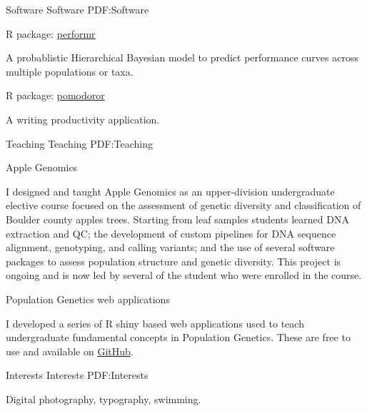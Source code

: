 \documentclass[letterpaper,MMMyyyy,nonstopmode]{simpleresumecv}
\begin{document}
\begin{Body}
{\Section
{Software}
{Software}
{PDF:Software}

\Gap
\BulletItem
R package: \href{https://github.com/silastittes/shiny_popgen}{\underline{performr}}
\hfill
\begin{Detail}
\Item A probablistic Hierarchical Bayesian model to predict performance curves across multiple populations or taxa. 
\end{Detail}

\BulletItem
R package: \href{https://github.com/silastittes/pomodoror}{\underline{pomodoror}}
\hfill
\begin{Detail}
\Item A writing productivity application.  
\end{Detail}



\Section
{Teaching}
{Teaching}
{PDF:Teaching}

\Gap
\BulletItem
Apple Genomics
\hfill
{}
\begin{Detail}
\Item I designed and taught Apple Genomics as an upper-division undergraduate elective course focused on the assessment of genetic diversity and classification of Boulder county apples trees. Starting from leaf samples students learned DNA extraction and QC; the development of custom pipelines for DNA sequence alignment, genotyping, and calling variants; and the use of several software packages to assess population structure and genetic diversity. This project is ongoing and is now led by several of the student who were enrolled in the course.
\end{Detail}

\BulletItem
Population Genetics web applications
\hfill
{}
\begin{Detail}
\Item I developed a series of R shiny based web applications used to teach undergraduate fundamental concepts in Population Genetics. These are free to use and available on \href{https://github.com/silastittes/shiny_popgen}{\underline{GitHub}}.
\end{Detail}


\iffalse



\Section
{Interests}
{Interests}
{PDF:Interests}

\Entry
Digital photography,
typography,
swimming.


}
\end{Body}
\end{document}
